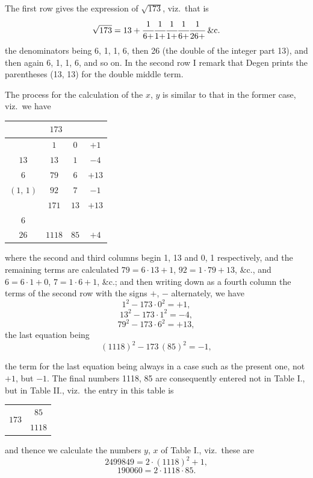 \documentclass[11pt]{article}
\begin{document}
The first row gives the expression of $\sqrt{173}$, viz.\ that is
\[
\sqrt{173} = 13 + \cfrac{1}{6 +} \cfrac{1}{1 +} \cfrac{1}{1 +} \cfrac{1}{6 +} \cfrac{1}{26 +}\;\&\text{c.}
\]
the denominators being 6, 1, 1, 6, then 26 (the double of the integer part 13), and then again 6, 1, 1, 6, and so on. In the second row I remark that Degen prints the parentheses (13, 13) for the double middle term.

The process for the calculation of the $x$, $y$ is similar to that in the former case, viz.\ we have
\begin{center}
\begin{tabular}{|c|c|c|c|}
\hline
\multicolumn{4}{|c|}{$173$} \\
\hline
 & $1$ & $0$ & $+ 1$ \\
$13$ & $13$ & $1$ & $- 4$ \\
$6$ & $79$ & $6$ & $+ 13$ \\
$(1,\,1)$ & $92$ & $7$ & $- 1$ \\
 & $171$ & $13$ & $+ 13$ \\
$6$ & & & \\
$26$ & $1118$ & $85$ & $+ 4$ \\
\hline
\end{tabular}
\end{center}
where the second and third columns begin 1, 13 and 0, 1 respectively, and the remaining terms are calculated $79 = 6 \cdot 13 + 1$, $92 = 1 \cdot 79 + 13$, \&c., and $6 = 6 \cdot 1 + 0$, $7 = 1 \cdot 6 + 1$, \&c.; and then writing down as a fourth column the terms of the second row with the signs $+$, $-$ alternately, we have
\[
1^2 - 173 \cdot 0^2 = + 1,
\]
\[
13^2 - 173 \cdot 1^2 = - 4,
\]
\[
79^2 - 173 \cdot 6^2 = + 13,
\]
the last equation being
\[
(1118)^2 - 173\,(85)^2 = - 1,
\]

the term for the last equation being always in a case such as the present one, not $+ 1$, but $- 1$. The final numbers 1118, 85 are consequently entered not in Table I., but in Table II., viz.\ the entry in this table is
\begin{center}
\begin{tabular}{c|c}
\multirow{2}{*}{$173$} & $85$ \\
 & $1118$ \\
\end{tabular}
\end{center}
and thence we calculate the numbers $y$, $x$ of Table I., viz.\ these are
\[
2499849 = 2 \cdot (1118)^2 + 1,
\]
\[
190060 = 2 \cdot 1118 \cdot 85.
\]
\end{document}
